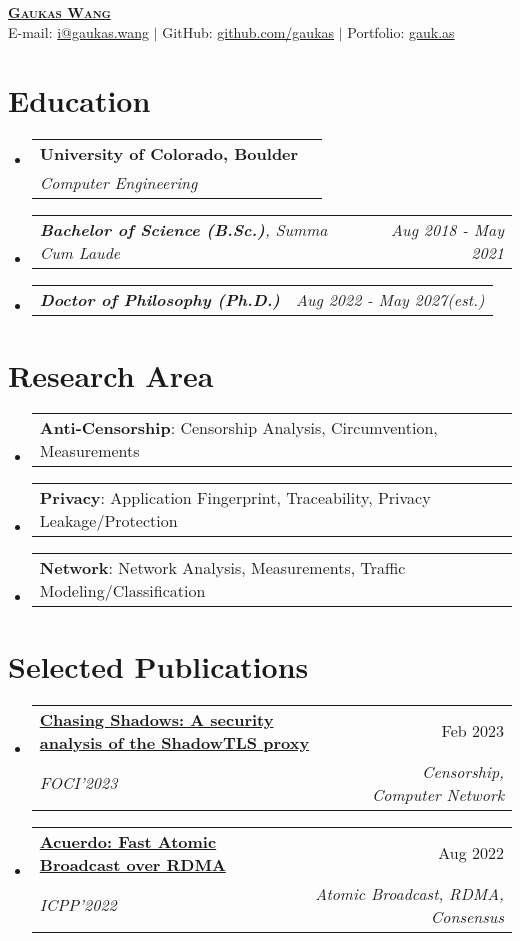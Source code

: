 \documentclass[letterpaper,11pt]{article}
\makeatletter
\newcommand{\resumeSubheading}[4]{
  \vspace{-2pt}\item
    \begin{tabular*}{0.97\textwidth}[t]{l@{\extracolsep{\fill}}r}
      \textbf{#1} & #2 \\
      \textit{\small#3} & \textit{\small #4} \\
    \end{tabular*}\vspace{-7pt}
}
\newcommand{\resumeSubSubheading}[2]{
    \item
    \begin{tabular*}{0.97\textwidth}{l@{\extracolsep{\fill}}r}
      \textit{\small#1} & \textit{\small #2} \\
    \end{tabular*}\vspace{-7pt}
}
\newcommand{\resumeProjectHeading}[2]{
    \item
    \begin{tabular*}{0.97\textwidth}{l@{\extracolsep{\fill}}r}
      \small#1 & #2 \\
    \end{tabular*}\vspace{-7pt}
}
\newcommand{\resumeSubHeadingListStart}{\begin{itemize}[leftmargin=0.15in, label={}]}
\newcommand{\resumeSubHeadingListEnd}{\end{itemize}}
\makeatother
\begin{document}
\begin{center}
  \href{https://gaukas.wang}{\textbf{\Huge \scshape Gaukas Wang}} \\ \vspace{1pt}
    E-mail: \href{mailto:i@gaukas.wang}{{i@gaukas.wang}} $|$ 
    GitHub: \href{https://github.com/gaukas}{{github.com/gaukas}} $|$ 
    Portfolio: \href{https://gauk.as}{gauk.as}
\end{center}


\section{Education}
\resumeSubHeadingListStart
\resumeSubheading
{University of Colorado, Boulder}{}
{Computer Engineering}{}
\resumeSubSubheading
{\textbf{Bachelor of Science (B.Sc.)}, {Summa Cum Laude}}{Aug 2018 - May 2021}
\resumeSubSubheading
{\textbf{Doctor of Philosophy (Ph.D.)}}{Aug 2022 - May 2027\textit{(est.)}}
\resumeSubHeadingListEnd

\vspace{1pt}

\section{Research Area}
\resumeSubHeadingListStart

\resumeProjectHeading
{\textbf{Anti-Censorship}: Censorship Analysis, Circumvention, Measurements}{}

\resumeProjectHeading
{\textbf{Privacy}: Application Fingerprint, Traceability, Privacy Leakage/Protection}{}

\resumeProjectHeading
{\textbf{Network}: Network Analysis, Measurements, Traffic Modeling/Classification}{}

\resumeSubHeadingListEnd
\vspace{1pt}

\section{Selected Publications}
\resumeSubHeadingListStart
  \resumeSubheading
  {\href{https://www.petsymposium.org/foci/2023/foci-2023-0002.php}{\textbf{Chasing Shadows: A security analysis of the ShadowTLS proxy}}}{Feb 2023}
  {FOCI'2023}{Censorship, Computer Network}
  \resumeSubheading
  {\href{https://dl.acm.org/doi/abs/10.1145/3545008.3545041}{\textbf{Acuerdo: Fast Atomic Broadcast over RDMA}}}{Aug 2022}
  {ICPP'2022}{Atomic Broadcast, RDMA, Consensus}
\resumeSubHeadingListEnd
\vspace{1pt}
\end{document}
